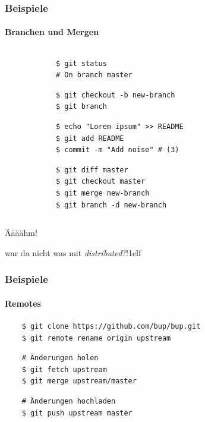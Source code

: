 \documentclass[]{beamer}
\begin{document}
\begin{frame}[fragile]
	\frametitle{Beispiele}
	\framesubtitle{Branchen und Mergen}
	\begin{columns}[T]
		\begin{column}{7.5cm}
			\begin{verbatim}
			$ git status
			# On branch master
			\end{verbatim}

			\begin{verbatim}
			$ git checkout -b new-branch
			$ git branch
			\end{verbatim}

			\begin{verbatim}
			$ echo "Lorem ipsum" >> README
			$ git add README
			$ commit -m "Add noise" # (3)
			\end{verbatim}

			\begin{verbatim}
			$ git diff master
			$ git checkout master
			$ git merge new-branch
			$ git branch -d new-branch
			\end{verbatim}
		\end{column}
		\begin{column}{2.5cm}
		\end{column}
	\end{columns}
\end{frame}

\begin{frame}
	\fontsize{30}{10}\selectfont Äääähm!
	\vspace*{0.5cm}

	\fontsize{20}{10}\selectfont war da nicht was mit \emph{distributed}?!1elf
\end{frame}

\begin{frame}[fragile]
	\frametitle{Beispiele}
	\framesubtitle{Remotes}
	\begin{verbatim}
	$ git clone https://github.com/bup/bup.git
	$ git remote rename origin upstream
	\end{verbatim}

	\begin{verbatim}
	# Änderungen holen
	$ git fetch upstream
	$ git merge upstream/master
	\end{verbatim}

	\begin{verbatim}
	# Änderungen hochladen
	$ git push upstream master
	\end{verbatim}
\end{frame}
\end{document}
